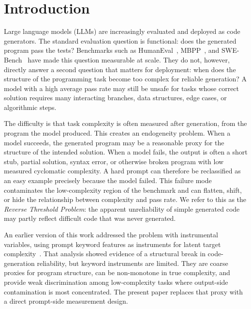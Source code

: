 \documentclass[conference]{IEEEtran}
\begin{document}
\section{Introduction}

Large language models (LLMs) are increasingly evaluated and deployed as code generators. The standard evaluation question is functional: does the generated program pass the tests? Benchmarks such as HumanEval~\cite{chen2021evaluating}, MBPP~\cite{austin2021program}, and SWE-Bench~\cite{jimenez2023swebench} have made this question measurable at scale. They do not, however, directly answer a second question that matters for deployment: when does the structure of the programming task become too complex for reliable generation? A model with a high average pass rate may still be unsafe for tasks whose correct solution requires many interacting branches, data structures, edge cases, or algorithmic steps.

The difficulty is that task complexity is often measured after generation, from the program the model produced. This creates an endogeneity problem. When a model succeeds, the generated program may be a reasonable proxy for the structure of the intended solution. When a model fails, the output is often a short stub, partial solution, syntax error, or otherwise broken program with low measured cyclomatic complexity. A hard prompt can therefore be reclassified as an easy example precisely because the model failed. This failure mode contaminates the low-complexity region of the benchmark and can flatten, shift, or hide the relationship between complexity and pass rate. We refer to this as the \emph{Reverse Threshold Problem}: the apparent unreliability of simple generated code may partly reflect difficult code that was never generated.

An earlier version of this work addressed the problem with instrumental variables, using prompt keyword features as instruments for latent target complexity~\cite{hernandez2026complexity}. That analysis showed evidence of a structural break in code-generation reliability, but keyword instruments are limited. They are coarse proxies for program structure, can be non-monotone in true complexity, and provide weak discrimination among low-complexity tasks where output-side contamination is most concentrated. The present paper replaces that proxy with a direct prompt-side measurement design.
\end{document}
